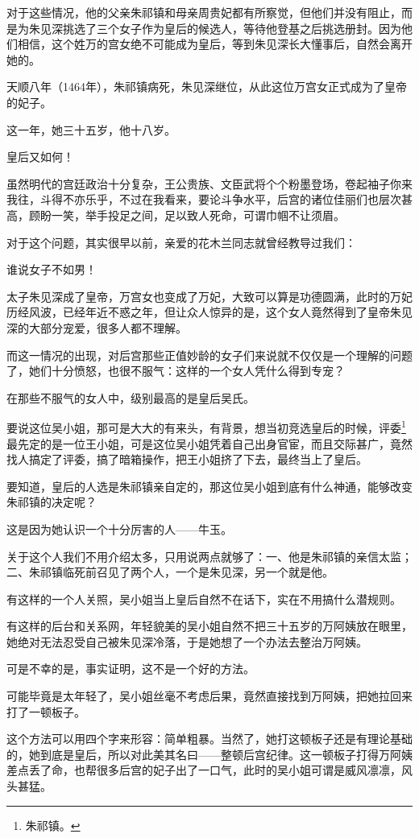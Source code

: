 \begin{multicols}{\theparacolNo}
		对于这些情况，他的父亲朱祁镇和母亲周贵妃都有所察觉，但他们并没有阻止，而是为朱见深挑选了三个女子作为皇后的候选人，等待他登基之后挑选册封。因为他们相信，这个姓万的宫女绝不可能成为皇后，等到朱见深长大懂事后，自然会离开她的。

		天顺八年（1464年），朱祁镇病死，朱见深继位，从此这位万宫女正式成为了皇帝的妃子。

		这一年，她三十五岁，他十八岁。

		皇后又如何！

		虽然明代的宫廷政治十分复杂，王公贵族、文臣武将个个粉墨登场，卷起袖子你来我往，斗得不亦乐乎，不过在我看来，要论斗争水平，后宫的诸位佳丽们也层次甚高，顾盼一笑，举手投足之间，足以致人死命，可谓巾帼不让须眉。

		对于这个问题，其实很早以前，亲爱的花木兰同志就曾经教导过我们：

		谁说女子不如男！

		太子朱见深成了皇帝，万宫女也变成了万妃，大致可以算是功德圆满，此时的万妃历经风波，已经年近不惑之年，但让众人惊异的是，这个女人竟然得到了皇帝朱见深的大部分宠爱，很多人都不理解。

		而这一情况的出现，对后宫那些正值妙龄的女子们来说就不仅仅是一个理解的问题了，她们十分愤怒，也很不服气：这样的一个女人凭什么得到专宠？

		在那些不服气的女人中，级别最高的是皇后吴氏。

		要说这位吴小姐，那可是大大的有来头，有背景，想当初竞选皇后的时候，评委\footnote{朱祁镇。}最先定的是一位王小姐，可是这位吴小姐凭着自己出身官宦，而且交际甚广，竟然找人搞定了评委，搞了暗箱操作，把王小姐挤了下去，最终当上了皇后。

		要知道，皇后的人选是朱祁镇亲自定的，那这位吴小姐到底有什么神通，能够改变朱祁镇的决定呢？

		这是因为她认识一个十分厉害的人——牛玉。

		关于这个人我们不用介绍太多，只用说两点就够了：一、他是朱祁镇的亲信太监；二、朱祁镇临死前召见了两个人，一个是朱见深，另一个就是他。

		有这样的一个人关照，吴小姐当上皇后自然不在话下，实在不用搞什么潜规则。

		有这样的后台和关系网，年轻貌美的吴小姐自然不把三十五岁的万阿姨放在眼里，她绝对无法忍受自己被朱见深冷落，于是她想了一个办法去整治万阿姨。

		可是不幸的是，事实证明，这不是一个好的方法。

		可能毕竟是太年轻了，吴小姐丝毫不考虑后果，竟然直接找到万阿姨，把她拉回来打了一顿板子。

		这个方法可以用四个字来形容：简单粗暴。当然了，她打这顿板子还是有理论基础的，她到底是皇后，所以对此美其名曰——整顿后宫纪律。这一顿板子打得万阿姨差点丢了命，也帮很多后宫的妃子出了一口气，此时的吴小姐可谓是威风凛凛，风头甚猛。


\end{multicols}
